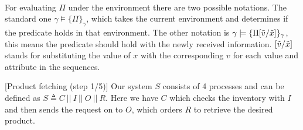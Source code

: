 \\
For evaluating $\Pi$ under the environment there are two possible notations. The standard one $\gamma \models \{ \Pi \}_{\gamma}$, which takes the current environment and determines if the predicate holds in that environment. The other notation is $\gamma \models \{ \Pi [\Tilde{v}/ \Tilde{x}] \}_{\gamma}$, this means the predicate should hold with the newly received information. $[\Tilde{v}/ \Tilde{x}]$ stands for substituting the value of $x$ with the corresponding $v$ for each value and attribute in the sequences.\\

\begin{example}\label{ex2}[Product fetching (step 1/5)]
    Our system $S$ consists of 4 processes and can be defined as $S\triangleq C\ ||\ I\ ||\ O\ ||\ R$. Here we have $C$ which checks the inventory with $I$ and then sends the request on to $O$, which orders $R$ to retrieve the desired product. 
\end{example}

